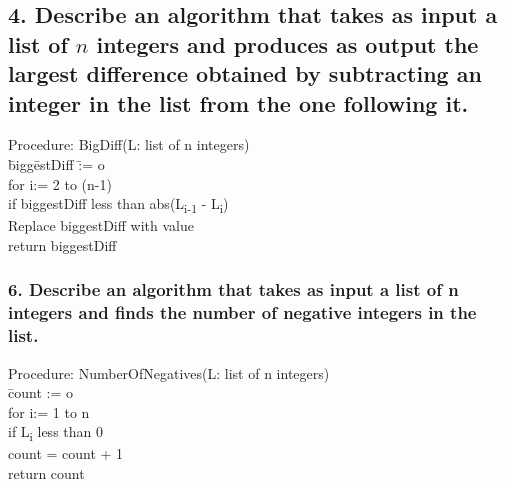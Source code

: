 \documentclass[11pt, oneside]{article} %
\numberwithin{equation}{section} %
\numberwithin{figure}{section} %
\numberwithin{table}{section} %
\begin{document}
\subsection{4. Describe an algorithm that takes as input a list of $n$ integers and produces as output the largest difference obtained by subtracting an integer in the list from the one following it.}
\begin{tabbing}
Procedure: BigDiff(L: list of n integers) \\
\=  bigg\=estDiff \=:= o \= \= \= \= \\
for i:= 2 to (n-1) \\ 
\> \> if biggestDiff less than abs(L\textsubscript{i-1} - L\textsubscript{i}) \\
\> \> \> Replace biggestDiff with value \\
\> return biggestDiff
\end{tabbing}

\subsubsection{6. Describe an algorithm that takes as input a list of n integers and finds the number of negative integers in the list.}
\begin{tabbing}
Procedure: NumberOfNegatives(L: list of n integers) \\
\=  count := o \= \= \= \= \= \\
\> for i:= 1 to n\\ 
\> \> if L\textsubscript{i} less than 0 \\
\> \> \> \> count = count + 1 \\
\> return count
\end{tabbing}
\end{document}
